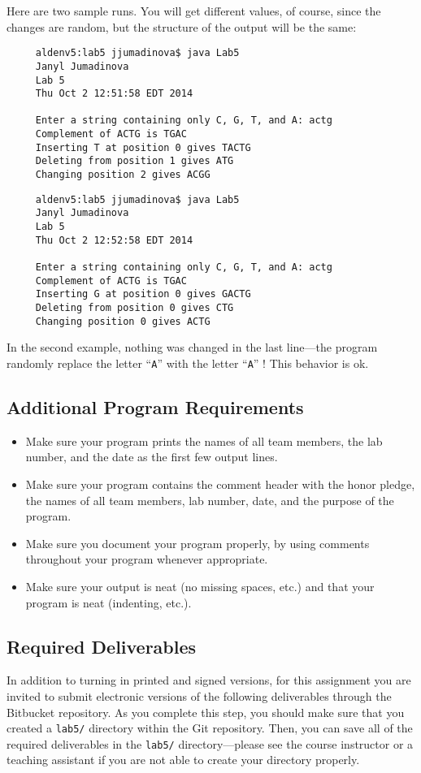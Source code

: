 Here are two sample runs. You will get different values, of course, since the
changes are random, but the structure of the output will be the same:
\begin{verbatim}
     aldenv5:lab5 jjumadinova$ java Lab5
     Janyl Jumadinova
     Lab 5
     Thu Oct 2 12:51:58 EDT 2014

     Enter a string containing only C, G, T, and A: actg
     Complement of ACTG is TGAC
     Inserting T at position 0 gives TACTG
     Deleting from position 1 gives ATG
     Changing position 2 gives ACGG
\end{verbatim}
\begin{verbatim}
     aldenv5:lab5 jjumadinova$ java Lab5
     Janyl Jumadinova
     Lab 5
     Thu Oct 2 12:52:58 EDT 2014

     Enter a string containing only C, G, T, and A: actg
     Complement of ACTG is TGAC
     Inserting G at position 0 gives GACTG
     Deleting from position 0 gives CTG
     Changing position 0 gives ACTG
\end{verbatim}

In the second example, nothing was changed in the last line---the program
randomly replace the letter ``{\tt A}'' with the letter ``{\tt A}'' !
This behavior is ok.

\vspace{-0.05in}
\subsection*{Additional Program Requirements}
\vspace{-0.05in}
\begin{itemize}
\item Make sure your program prints the names of all team members, the lab number, and the date as the first few output lines.
\item Make sure your program contains the comment header with the honor pledge, the names of all team members, lab number, date, and the purpose of the program.
\item Make sure you document your program properly, by using comments throughout your program whenever appropriate.
\item Make sure your output
is neat (no missing spaces, etc.) and that your program is neat (indenting, etc.).
\end{itemize}

\vspace{-0.05in}
\subsection*{Required Deliverables}
\vspace{-0.05in}
In addition to turning in printed and signed versions, for this assignment you are invited to submit electronic versions of the following deliverables through the Bitbucket repository. As you complete this step, you should make sure that you
created a {\tt lab5/} directory within the Git repository.  Then, you can save all of the required deliverables in the
{\tt lab5/} directory---please see the course instructor or a teaching assistant if you are not able to create your
directory properly.

